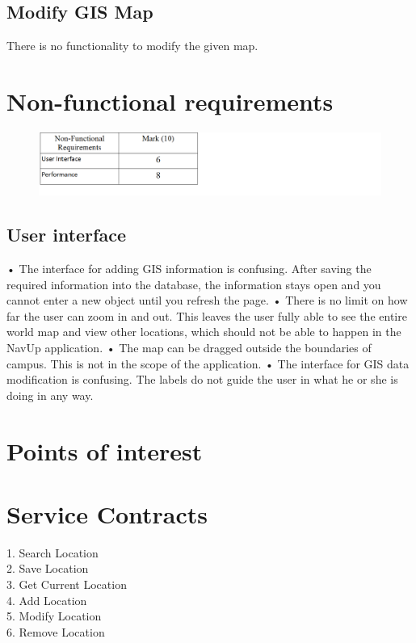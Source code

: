 \documentclass[english]{article}
\begin{document}
\subsection{Modify GIS Map}
There is no functionality to modify the given map.
\section{Non-functional requirements}
\begin{figure}[H]
\hspace*{-2.5cm}
\includegraphics[width=180mm]{NFRMarks.png}
\end{figure}
\subsection{User interface}
•	The interface for adding GIS information is confusing. After saving the required information into the database, the information stays open and you cannot enter a new object until you refresh the page.
•	There is no limit on how far the user can zoom in and out. This leaves the user fully able to see the entire world map and view other locations, which should not be able to happen in the NavUp application.
•	The map can be dragged outside the boundaries of campus. This is not in the scope of the application.
•	The interface for GIS data modification is confusing. The labels do not guide the user in what he or she is doing in any way.
\section{Points of interest}
\section{Service Contracts}
1. Search Location\\
2. Save Location\\
3. Get Current Location\\
4. Add Location\\
5. Modify Location\\
6. Remove Location\\
\end{document}
